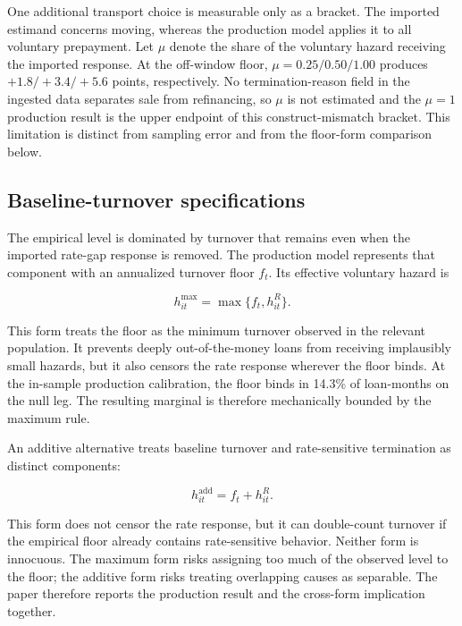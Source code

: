 One additional transport choice is measurable only as a bracket. The imported estimand concerns moving, whereas the production model applies it to all voluntary prepayment. Let $\mu$ denote the share of the voluntary hazard receiving the imported response. At the off-window floor, $\mu=0.25/0.50/1.00$ produces $+1.8/+3.4/+5.6$ points, respectively. No termination-reason field in the ingested data separates sale from refinancing, so $\mu$ is not estimated and the $\mu=1$ production result is the upper endpoint of this construct-mismatch bracket. This limitation is distinct from sampling error and from the floor-form comparison below.

\subsection{Baseline-turnover specifications}

The empirical level is dominated by turnover that remains even when the imported rate-gap response is removed. The production model represents that component with an annualized turnover floor $f_t$. Its effective voluntary hazard is

\begin{equation}
h^{\max}_{it}=\max\{f_t,h^{R}_{it}\}.
\label{eq:maxfloor}
\end{equation}

This form treats the floor as the minimum turnover observed in the relevant population. It prevents deeply out-of-the-money loans from receiving implausibly small hazards, but it also censors the rate response wherever the floor binds. At the in-sample production calibration, the floor binds in 14.3\% of loan-months on the null leg. The resulting marginal is therefore mechanically bounded by the maximum rule.

An additive alternative treats baseline turnover and rate-sensitive termination as distinct components:

\begin{equation}
h^{\mathrm{add}}_{it}=f_t+h^{R}_{it}.
\label{eq:addfloor}
\end{equation}

This form does not censor the rate response, but it can double-count turnover if the empirical floor already contains rate-sensitive behavior. Neither form is innocuous. The maximum form risks assigning too much of the observed level to the floor; the additive form risks treating overlapping causes as separable. The paper therefore reports the production result and the cross-form implication together.

